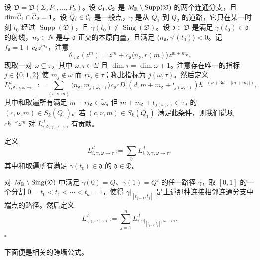 \begin{definition}
  设 $\mathfrak{D}=\mathfrak{D}(\Sigma,P_1,\ldots,P_k)$。设 $\mathcal{C}_1,\mathcal{C}_2$ 是 $M_{\mathbb{R}}\setminus\operatorname{Supp}(\mathfrak{D})$ 的两个连通分支，且 $\dim\overline{\mathcal{C}}_1\cap\overline{\mathcal{C}}_2=1$。设 $Q_i\in\mathcal{C}_i$ 是一般点，$\gamma$ 是从 $Q_1$ 到 $Q_2$ 的道路，它只在某一时刻 $t_0$ 经过 $\operatorname{Supp}(\mathfrak{D})$，且 $\gamma(t_0)\notin\operatorname{Sing}(\mathfrak{D})$。设 $\mathfrak{d}\in\mathfrak{D}$ 是满足 $\gamma(t_0)\in\mathfrak{d}$ 的射线，$n_{\mathfrak{d}}\in N$ 是与 $\mathfrak{d}$ 正交的本原向量，且满足 $\langle n_{\mathfrak{d}},\gamma'(t_0)\rangle<0$。记 $f_{\mathfrak{d}}=1+c_{\mathfrak{d}}z^{m_{\mathfrak{d}}}$，注意
  \[
    \theta_{\gamma,\mathfrak{d}}(z^m)=z^m+c_{\mathfrak{d}}\langle n_{\mathfrak{d}},r(m)\rangle z^{m+m_{\mathfrak{d}}}.
  \]
  现取一对 $\omega\subsetneq\tau$，其中 $\omega,\tau\in\Sigma$ 且 $\dim\tau=\dim\omega+1$。注意存在唯一的指标 $j\in\{0,1,2\}$ 使 $m_j\notin\omega$ 而 $m_j\in\tau$；称此指标为 $j(\omega,\tau)$。然后定义
  \[
    L_{i,\mathfrak{d},\gamma,\omega\to\tau}^d:=\sum_{(c,\nu,m)}
    \langle n_{\mathfrak{d}},m_{j(\omega,\tau)}\rangle c_{\mathfrak{d}}cD_i(d,m+m_{\mathfrak{d}}+t_{j(\omega,\tau)})
    \hbar^{-(\nu+3d-|m+m_{\mathfrak{d}}|)},
  \]
  其中和取遍所有满足 $m+m_{\mathfrak{d}}\in\tilde\omega_d$ 但 $m+m_{\mathfrak{d}}+t_{j(\omega,\tau)}\in\tilde\tau_d$ 的 $(c,\nu,m)\in S_k(Q_1)$。若 $(c,\nu,m)\in S_k(Q_1)$ 满足此条件，则我们说项 $c\hbar^{-\nu}z^m$ 对 $L_{i,\mathfrak{d},\gamma,\omega\to\tau}^d$ 有贡献。

  定义
  \[
    L_{i,\gamma,\omega\to\tau}^d:=\sum_{\mathfrak{d}}L_{i,\mathfrak{d},\gamma,\omega\to\tau}^d,
  \]
  其中和取遍所有满足 $\gamma(t_0)\in\mathfrak{d}$ 的 $\mathfrak{d}\in\mathfrak{D}$。

  对 $M_{\mathbb{R}}\setminus\operatorname{Sing}(\mathfrak{D})$ 中满足 $\gamma(0)=Q$、$\gamma(1)=Q'$ 的任一路径 $\gamma$，取 $[0,1]$ 的一个分割 $0=t_0<t_1<\cdots<t_n=1$，使得 $\gamma|_{[t_{j-1},t_j]}$ 是上述那种连接相邻连通分支中端点的路径。然后定义
  \[
    L_{i,\gamma,\omega\to\tau}^d:=\sum_{j=1}^{n}L_{i,\gamma|_{[t_{j-1},t_j]},\omega\to\tau}^d.
  \]
\hfill$\square$
\end{definition}


下面便是相关的跨墙公式。
